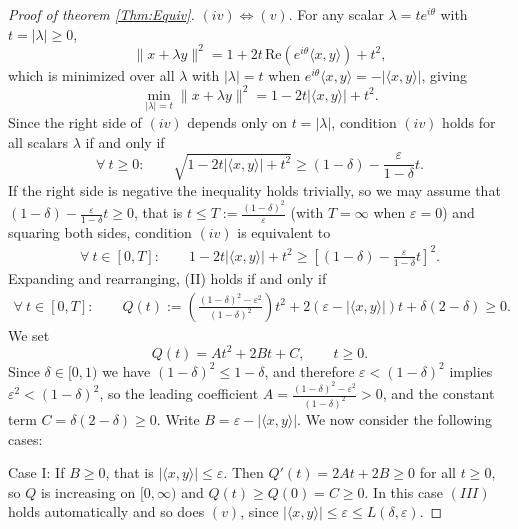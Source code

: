 \documentclass[11pt, reqno]{amsart}
\theoremstyle{definition}
\begin{document}
\begin{proof}[Proof of theorem \ref{Thm:Equiv}]
\noindent $(iv)\iff(v)$. For any scalar $\lambda=te^{i\theta}$ with $t=|\lambda|\geq 0$,
\[
\|x+\lambda y\|^2=1+2t\,\mathrm{Re}(e^{i\theta}\langle x,y\rangle)+t^2,
\]
which is minimized over all $\lambda$ with $|\lambda|=t$ when $e^{i\theta}\langle x,y\rangle=-|\langle x,y\rangle|$, giving
\[
\min_{|\lambda|=t}\|x+\lambda y\|^2=1-2t|\langle x,y\rangle|+t^2.
\]
Since the right side of $(iv)$ depends only on $t=|\lambda|$, condition $(iv)$ holds for all scalars $\lambda$ if and only if
\[
\forall ~t\geq 0: \qquad \sqrt{1-2t|\langle x,y\rangle|+t^2}\geq(1-\delta)-\frac{\varepsilon}{1-\delta}t.
\]
If the right side is negative the inequality holds trivially, 
so we may assume that $(1-\delta)-\frac{\varepsilon}{1-\delta}t\geq 0$, 
 that is $t\leq T:=\frac{(1-\delta)^2}{\varepsilon}$ (with $T=\infty$ when $\varepsilon=0$) and squaring both sides, condition $(iv)$ is equivalent to
\begin{align}
\forall ~ t\in[0,T]: \qquad 1-2t|\langle x,y\rangle|+t^2\geq\left[(1-\delta)-\frac{\varepsilon}{1-\delta}t\right]^2.\tag{II}
\end{align}
Expanding and rearranging, (II) holds if and only if
\begin{align}
\forall~ t\in[0,T]:\qquad Q(t):=\left(\frac{(1-\delta)^2-\varepsilon^2}
{(1-\delta)^2}\right)t^2+2\left(\varepsilon-|\langle x,y\rangle|
\right)t+\delta(2-\delta)\geq 0.\tag{III}
\end{align}
We set
\[
Q(t) = At^2+2Bt+C, \qquad t\geq 0.
\]
Since $\delta\in[0,1)$ we have $(1-\delta)^2\leq 1-\delta$, and therefore 
$\varepsilon<(1-\delta)^2$ implies $\varepsilon^2<(1-\delta)^2$, so the 
leading coefficient $A=\frac{(1-\delta)^2-\varepsilon^2}{(1-\delta)^2}>0$, 
and the constant term $C=\delta(2-\delta)\geq 0$. Write $B=\varepsilon
-|\langle x,y\rangle|$. We now consider the following cases:

\medskip


\noindent Case I: If $B\geq 0$, that is $|\langle x,y\rangle|
\leq\varepsilon$. Then $Q'(t)=2At+2B\geq 0$ for all $t\geq 0$, so $Q$ 
is increasing on $[0,\infty)$ and $Q(t)\geq Q(0)=C\geq 0$. In this case 
$(III)$ holds automatically and so does $(v)$, since $|\langle x,y
\rangle|\leq\varepsilon\leq L(\delta,\varepsilon)$. 


\medskip



\end{proof}
\end{document}

